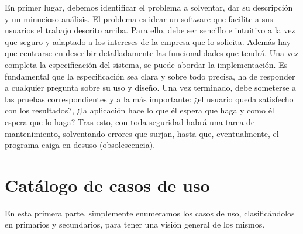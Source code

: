 \documentclass[spanish,a4paper,12pt]{report}	%
\begin{document}
En primer lugar, debemos identificar el problema a solventar, dar su descripción y un minucioso análisis. El problema es idear un software que facilite a sus usuarios el trabajo descrito arriba. Para ello, debe ser sencillo e intuitivo a la vez que seguro y adaptado a los intereses de la empresa que lo solicita. Además hay que centrarse en describir detalladamente las funcionalidades que tendrá. Una vez completa la especificación del sistema, se puede abordar la implementación. Es fundamental que la especificación sea clara y sobre todo precisa, ha de responder a cualquier pregunta sobre su uso y diseño. Una vez terminado, debe someterse a las pruebas correspondientes y a la más importante: ¿el usuario queda satisfecho con los resultados?, ¿la aplicación hace lo que él espera que haga y como él espera que lo haga? Tras esto, con toda seguridad habrá una tarea de mantenimiento, solventando errores que surjan, hasta que, eventualmente, el programa caiga en desuso (obsolescencia).

\newpage
\mbox{}
\thispagestyle{empty}						%
\newpage

\setcounter{section}{0}

\part{Catálogo de casos de uso} %
En esta primera parte, simplemente enumeramos los casos de uso, clasificándolos en primarios y secundarios, para tener una visión general de los mismos.
\end{document}
